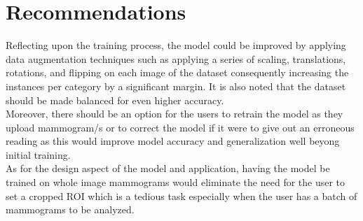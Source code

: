 \section{Recommendations}
\qquad Reflecting upon the training process, the model could be improved by applying data augmentation techniques such as applying a series of scaling, translations, rotations, and flipping on each image of the dataset consequently increasing the instances per category by a significant margin. It is also noted that the dataset should be made balanced for even higher accuracy. \\

	Moreover, there should be an option for the users to retrain the model as they upload mammogram/s or to correct the model if it were to give out an erroneous reading as this would improve model accuracy and generalization well beyong initial training. \\

	As for the design aspect of the model and application, having the model be trained on whole image mammograms would eliminate the need for the user to set a cropped ROI which is a tedious task especially when the user has a batch of mammograms to be analyzed.

\clearpage